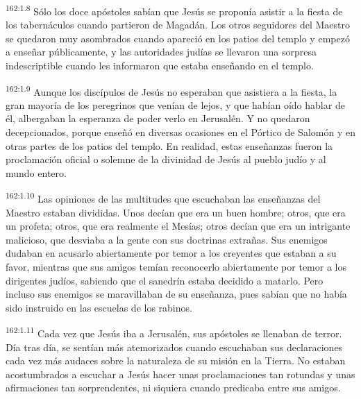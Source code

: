 \par 
\textsuperscript{162:1.8} Sólo los doce apóstoles sabían que Jesús se proponía asistir a la fiesta de los tabernáculos cuando partieron de Magadán. Los otros seguidores del Maestro se quedaron muy asombrados cuando apareció en los patios del templo y empezó a enseñar públicamente, y las autoridades judías se llevaron una sorpresa indescriptible cuando les informaron que estaba enseñando en el templo.

\par 
\textsuperscript{162:1.9} Aunque los discípulos de Jesús no esperaban que asistiera a la fiesta, la gran mayoría de los peregrinos que venían de lejos, y que habían oído hablar de él, albergaban la esperanza de poder verlo en Jerusalén. Y no quedaron decepcionados, porque enseñó en diversas ocasiones en el Pórtico de Salomón y en otras partes de los patios del templo. En realidad, estas enseñanzas fueron la proclamación oficial o solemne de la divinidad de Jesús al pueblo judío y al mundo entero.

\par 
\textsuperscript{162:1.10} Las opiniones de las multitudes que escuchaban las enseñanzas del Maestro estaban divididas. Unos decían que era un buen hombre; otros, que era un profeta; otros, que era realmente el Mesías; otros decían que era un intrigante malicioso, que desviaba a la gente con sus doctrinas extrañas. Sus enemigos dudaban en acusarlo abiertamente por temor a los creyentes que estaban a su favor, mientras que sus amigos temían reconocerlo abiertamente por temor a los dirigentes judíos, sabiendo que el sanedrín estaba decidido a matarlo. Pero incluso sus enemigos se maravillaban de su enseñanza, pues sabían que no había sido instruido en las escuelas de los rabinos.

\par 
\textsuperscript{162:1.11} Cada vez que Jesús iba a Jerusalén, sus apóstoles se llenaban de terror. Día tras día, se sentían más atemorizados cuando escuchaban sus declaraciones cada vez más audaces sobre la naturaleza de su misión en la Tierra. No estaban acostumbrados a escuchar a Jesús hacer unas proclamaciones tan rotundas y unas afirmaciones tan sorprendentes, ni siquiera cuando predicaba entre sus amigos.

